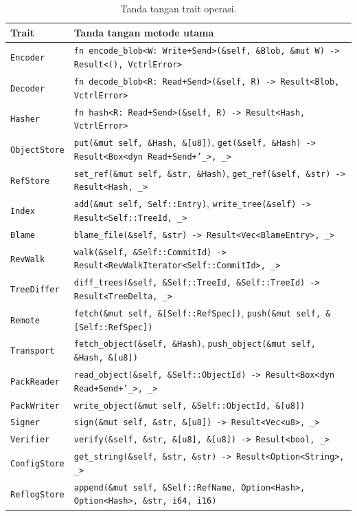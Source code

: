 \documentclass[11pt,a4paper]{article}
\begin{document}
\begin{table}[H]
	\centering
	\caption{Tanda tangan trait operasi.}
	\label{tab:trait}
	\footnotesize
	\begin{tabularx}{\textwidth}{l X}
		\toprule
		Trait & Tanda tangan metode utama \\
		\midrule
		\texttt{Encoder} & \texttt{fn encode\_blob<W: Write+Send>(\&self, \&Blob, \&mut W) -> Result<(), VctrlError>} \\
		\texttt{Decoder} & \texttt{fn decode\_blob<R: Read+Send>(\&self, R) -> Result<Blob, VctrlError>} \\
		\texttt{Hasher} & \texttt{fn hash<R: Read+Send>(\&self, R) -> Result<Hash, VctrlError>} \\
		\texttt{ObjectStore} & \texttt{put(\&mut self, \&Hash, \&[u8])}, \texttt{get(\&self, \&Hash) -> Result<Box<dyn Read+Send+'\_>, \_>} \\
		\texttt{RefStore} & \texttt{set\_ref(\&mut self, \&str, \&Hash)}, \texttt{get\_ref(\&self, \&str) -> Result<Hash, \_>} \\
		\texttt{Index} & \texttt{add(\&mut self, Self::Entry)}, \texttt{write\_tree(\&self) -> Result<Self::TreeId, \_>} \\
		\texttt{Blame} & \texttt{blame\_file(\&self, \&str) -> Result<Vec<BlameEntry>, \_>} \\
		\texttt{RevWalk} & \texttt{walk(\&self, \&Self::CommitId) -> Result<RevWalkIterator<Self::CommitId>, \_>} \\
		\texttt{TreeDiffer} & \texttt{diff\_trees(\&self, \&Self::TreeId, \&Self::TreeId) -> Result<TreeDelta, \_>} \\
		\texttt{Remote} & \texttt{fetch(\&mut self, \&[Self::RefSpec])}, \texttt{push(\&mut self, \&[Self::RefSpec])} \\
		\texttt{Transport} & \texttt{fetch\_object(\&self, \&Hash)}, \texttt{push\_object(\&mut self, \&Hash, \&[u8])} \\
		\texttt{PackReader} & \texttt{read\_object(\&self, \&Self::ObjectId) -> Result<Box<dyn Read+Send+'\_>, \_>} \\
		\texttt{PackWriter} & \texttt{write\_object(\&mut self, \&Self::ObjectId, \&[u8])} \\
		\texttt{Signer} & \texttt{sign(\&mut self, \&str, \&[u8]) -> Result<Vec<u8>, \_>} \\
		\texttt{Verifier} & \texttt{verify(\&self, \&str, \&[u8], \&[u8]) -> Result<bool, \_>} \\
		\texttt{ConfigStore} & \texttt{get\_string(\&self, \&str, \&str) -> Result<Option<String>, \_>} \\
		\texttt{ReflogStore} & \texttt{append(\&mut self, \&Self::RefName, Option<Hash>, Option<Hash>, \&str, i64, i16)} \\
		\bottomrule
	\end{tabularx}
\end{table}
\end{document}
